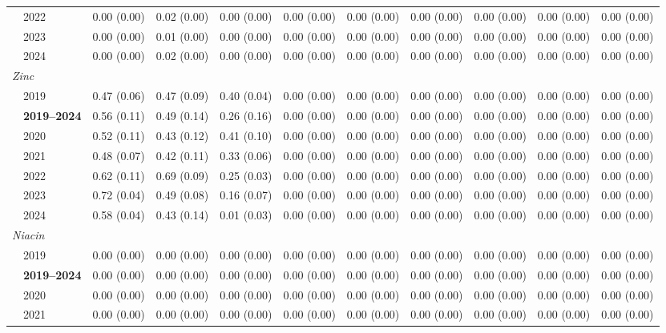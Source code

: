 \begin{table}[htbp]
\begin{tabular}{llrrrrrrrrr}
 & 2022 & 0.00 (0.00) & 0.02 (0.00) & 0.00 (0.00) & 0.00 (0.00) & 0.00 (0.00) & 0.00 (0.00) & 0.00 (0.00) & 0.00 (0.00) & 0.00 (0.00) \\
 & 2023 & 0.00 (0.00) & 0.01 (0.00) & 0.00 (0.00) & 0.00 (0.00) & 0.00 (0.00) & 0.00 (0.00) & 0.00 (0.00) & 0.00 (0.00) & 0.00 (0.00) \\
 & 2024 & 0.00 (0.00) & 0.02 (0.00) & 0.00 (0.00) & 0.00 (0.00) & 0.00 (0.00) & 0.00 (0.00) & 0.00 (0.00) & 0.00 (0.00) & 0.00 (0.00) \\
\midrule
\multicolumn{11}{l}{\textit{Zinc}} \\
 & 2019 & 0.47 (0.06) & 0.47 (0.09) & 0.40 (0.04) & 0.00 (0.00) & 0.00 (0.00) & 0.00 (0.00) & 0.00 (0.00) & 0.00 (0.00) & 0.00 (0.00) \\
 & \textbf{2019–2024} & 0.56 (0.11) & 0.49 (0.14) & 0.26 (0.16) & 0.00 (0.00) & 0.00 (0.00) & 0.00 (0.00) & 0.00 (0.00) & 0.00 (0.00) & 0.00 (0.00) \\
 & 2020 & 0.52 (0.11) & 0.43 (0.12) & 0.41 (0.10) & 0.00 (0.00) & 0.00 (0.00) & 0.00 (0.00) & 0.00 (0.00) & 0.00 (0.00) & 0.00 (0.00) \\
 & 2021 & 0.48 (0.07) & 0.42 (0.11) & 0.33 (0.06) & 0.00 (0.00) & 0.00 (0.00) & 0.00 (0.00) & 0.00 (0.00) & 0.00 (0.00) & 0.00 (0.00) \\
 & 2022 & 0.62 (0.11) & 0.69 (0.09) & 0.25 (0.03) & 0.00 (0.00) & 0.00 (0.00) & 0.00 (0.00) & 0.00 (0.00) & 0.00 (0.00) & 0.00 (0.00) \\
 & 2023 & 0.72 (0.04) & 0.49 (0.08) & 0.16 (0.07) & 0.00 (0.00) & 0.00 (0.00) & 0.00 (0.00) & 0.00 (0.00) & 0.00 (0.00) & 0.00 (0.00) \\
 & 2024 & 0.58 (0.04) & 0.43 (0.14) & 0.01 (0.03) & 0.00 (0.00) & 0.00 (0.00) & 0.00 (0.00) & 0.00 (0.00) & 0.00 (0.00) & 0.00 (0.00) \\
\midrule
\multicolumn{11}{l}{\textit{Niacin}} \\
 & 2019 & 0.00 (0.00) & 0.00 (0.00) & 0.00 (0.00) & 0.00 (0.00) & 0.00 (0.00) & 0.00 (0.00) & 0.00 (0.00) & 0.00 (0.00) & 0.00 (0.00) \\
 & \textbf{2019–2024} & 0.00 (0.00) & 0.00 (0.00) & 0.00 (0.00) & 0.00 (0.00) & 0.00 (0.00) & 0.00 (0.00) & 0.00 (0.00) & 0.00 (0.00) & 0.00 (0.00) \\
 & 2020 & 0.00 (0.00) & 0.00 (0.00) & 0.00 (0.00) & 0.00 (0.00) & 0.00 (0.00) & 0.00 (0.00) & 0.00 (0.00) & 0.00 (0.00) & 0.00 (0.00) \\
 & 2021 & 0.00 (0.00) & 0.00 (0.00) & 0.00 (0.00) & 0.00 (0.00) & 0.00 (0.00) & 0.00 (0.00) & 0.00 (0.00) & 0.00 (0.00) & 0.00 (0.00) \\

\end{tabular}
\end{table}
